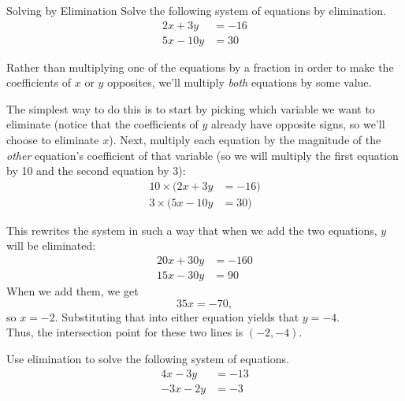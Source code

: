 \begin{example}[https://www.youtube.com/watch?v=fN5tA1onlu4]{Solving by Elimination}
Solve the following system of equations by elimination.
\begin{align*}
2x+3y &= -16\\
5x-10y &= 30
\end{align*}

\sol
Rather than multiplying one of the equations by a fraction in order to make the coefficients of $x$ or $y$ opposites, we'll multiply \emph{both} equations by some value.  

The simplest way to do this is to start by picking which variable we want to eliminate (notice that the coefficients of $y$ already have opposite signs, so we'll choose to eliminate $x$).  Next, multiply each equation by the magnitude of the \emph{other} equation's coefficient of that variable (so we will multiply the first equation by 10 and the second equation by 3):
\begin{align*}
10 \times (2x+3y &= -16)\\
3 \times (5x-10y &= 30)
\end{align*}

This rewrites the system in such a way that when we add the two equations, $y$ will be eliminated:
\begin{align*}
20x+30y &= -160\\
15x-30y &= 90
\end{align*}
When we add them, we get \[35x=-70,\] so $x=-2$.  Substituting that into either equation yields that $y=-4$.\\

Thus, the intersection point for these two lines is $\boxed{(-2,-4)}$.
\end{example}

\begin{try}
Use elimination to solve the following system of equations.
\begin{align*}
4x-3y &= -13\\
-3x-2y &= -3
\end{align*}
\end{try}